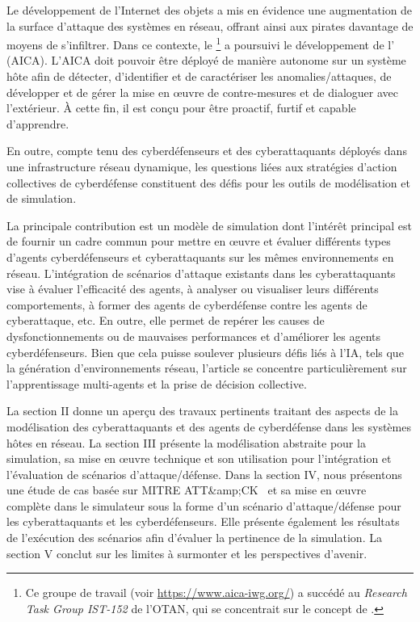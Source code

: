 \noindent
Le développement de l'Internet des objets a mis en évidence une augmentation de la surface d'attaque des systèmes en réseau, offrant ainsi aux pirates davantage de moyens de s'infiltrer.
Dans ce contexte, le \footnote{Ce groupe de travail (voir \url{https://www.aica-iwg.org/}) a succédé au \textit{Research Task Group IST-152} de l'OTAN, qui se concentrait sur le concept de .} a poursuivi le développement de l' (AICA).
L'AICA doit pouvoir être déployé de manière autonome sur un système hôte afin de détecter, d'identifier et de caractériser les anomalies/attaques, de développer et de gérer la mise en œuvre de contre-mesures et de dialoguer avec l'extérieur. À cette fin, il est conçu pour être proactif, furtif et capable d'apprendre.

En outre, compte tenu des cyberdéfenseurs et des cyberattaquants déployés dans une infrastructure réseau dynamique, les questions liées aux stratégies d'action collectives de cyberdéfense constituent des défis pour les outils de modélisation et de simulation.

\noindent
La principale contribution est un modèle de simulation dont l'intérêt principal est de fournir un cadre commun pour mettre en œuvre et évaluer différents types d'agents cyberdéfenseurs et cyberattaquants sur les mêmes environnements en réseau. L'intégration de scénarios d'attaque existants dans les cyberattaquants vise à évaluer l'efficacité des agents, à analyser ou visualiser leurs différents comportements, à former des agents de cyberdéfense contre les agents de cyberattaque, etc. En outre, elle permet de repérer les causes de dysfonctionnements ou de mauvaises performances et d'améliorer les agents cyberdéfenseurs. Bien que cela puisse soulever plusieurs défis liés à l'IA, tels que la génération d'environnements réseau, l'article se concentre particulièrement sur l'apprentissage multi-agents et la prise de décision collective.

La section II donne un aperçu des travaux pertinents traitant des aspects de la modélisation des cyberattaquants et des agents de cyberdéfense dans les systèmes hôtes en réseau. La section III présente la modélisation abstraite pour la simulation, sa mise en œuvre technique et son utilisation pour l'intégration et l'évaluation de scénarios d'attaque/défense. Dans la section IV, nous présentons une étude de cas basée sur MITRE ATT\&amp;CK~\cite{MITREATTACKWebiste} et sa mise en œuvre complète dans le simulateur sous la forme d'un scénario d'attaque/défense pour les cyberattaquants et les cyberdéfenseurs. Elle présente également les résultats de l'exécution des scénarios afin d'évaluer la pertinence de la simulation. La section V conclut sur les limites à surmonter et les perspectives d'avenir.

